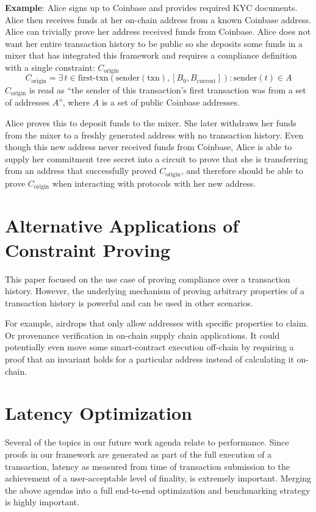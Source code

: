 \documentclass[9pt]{extreport}
\begin{document}
\textbf{Example}: Alice signs up to Coinbase and provides required KYC documents.  Alice then receives funds at her on-chain address from a known Coinbase address.  Alice can trivially prove her address received funds from Coinbase.  Alice does not want her entire transaction history to be public so she deposits some funds in a mixer that has integrated this framework and requires a compliance definition with a single constraint: $C_{\text{origin}}$
$$C_{\text{origin}} = \exists \, t \in \text{first-txn}(\text{sender}(\text{txn}), [B_0, B_{\text{current}}]) : \text{sender}(t) \in A$$
$C_{\text{origin}}$ is read as ``the sender of this transaction's first transaction was from a set of addresses $A$'', where $A$ is a set of public Coinbase addresses.

Alice proves this to deposit funds to the mixer.  She later withdraws her funds from the mixer to a freshly generated address with no transaction history.  Even though this new address never received funds from Coinbase, Alice is able to supply her commitment tree secret into a circuit to prove that she is transferring from an address that successfully proved $C_{\text{origin}}$, and therefore should be able to prove $C_{\text{origin}}$ when interacting with protocols with her new address.

\section{Alternative Applications of Constraint Proving}
This paper focused on the use case of proving compliance over a transaction history.  However, the underlying mechanism of proving arbitrary properties of a transaction history is powerful and can be used in other scenarios.  

For example, airdrops that only allow addresses with specific properties to claim.  Or provenance verification in on-chain supply chain applications.  It could potentially even move some smart-contract execution off-chain by requiring a proof that an invariant holds for a particular address instead of calculating it on-chain.

\section{Latency Optimization}
Several of the topics in our future work agenda relate to performance.  Since proofs in our framework are generated as part of the full execution of a transaction, latency as measured from time of transaction submission to the achievement of a user-acceptable level of finality, is extremely important.  Merging the above agendas into a full end-to-end optimization and benchmarking strategy is highly important.
\end{document}
